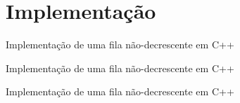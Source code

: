 \section{Implementação}

\begin{frame}[fragile]{Implementação de uma fila não-decrescente em C++}
\end{frame}

\begin{frame}[fragile]{Implementação de uma fila não-decrescente em C++}
\end{frame}

\begin{frame}[fragile]{Implementação de uma fila não-decrescente em C++}
\end{frame}
